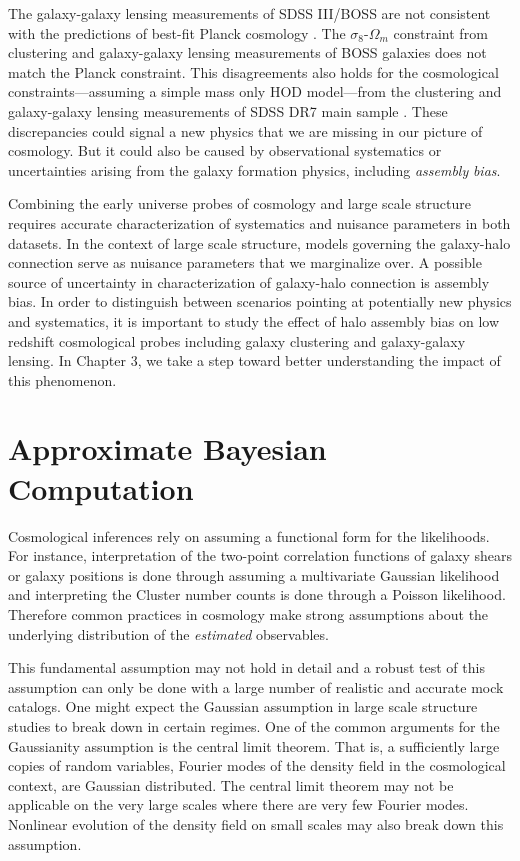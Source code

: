 The galaxy-galaxy lensing measurements of SDSS III/BOSS \citep{miyatake15,lensingislow} are not consistent with the predictions of best-fit Planck cosmology \citep{planckII}.
The $\sigma_{8}$-$\Omega_{m}$ constraint from clustering and galaxy-galaxy lensing measurements of BOSS galaxies \citep{more15} does not match the Planck constraint.
This disagreements also holds for the cosmological constraints---assuming a simple mass only HOD model---from the clustering and galaxy-galaxy lensing measurements of SDSS DR7 main sample \citep{cacciato13}. These discrepancies could signal a new physics that we are missing in our picture of cosmology. But it could also be caused by observational systematics or uncertainties arising from the galaxy formation physics, including \emph{assembly} \emph{bias}.

Combining the early universe probes of cosmology and large scale structure requires accurate 
characterization of systematics and nuisance parameters in both datasets. In the context of large scale 
structure, models governing the galaxy-halo connection serve as nuisance parameters that we marginalize over. A possible source of uncertainty in characterization of galaxy-halo connection is assembly bias. In order to distinguish between scenarios pointing at potentially new physics and systematics, it is important to study the effect of halo assembly bias on low redshift cosmological probes including galaxy clustering and galaxy-galaxy lensing. In Chapter 3, we take a step toward better understanding the impact of this phenomenon. 

\section{Approximate Bayesian Computation}

Cosmological inferences rely on assuming a functional form for the likelihoods. For instance, interpretation of the 
two-point correlation functions of galaxy shears or galaxy positions is done through assuming a multivariate Gaussian likelihood 
and interpreting the Cluster number counts is done through a Poisson likelihood. Therefore common practices in 
cosmology make strong assumptions about the underlying distribution of the \emph{estimated} observables.

This fundamental assumption may not hold in detail and a robust test of this assumption can only be done with a large 
number of realistic and accurate mock catalogs. One might expect the Gaussian assumption in large scale structure studies 
to break down in certain regimes. One of the common arguments for the Gaussianity assumption is the central limit theorem. That is, a sufficiently large copies 
of random variables, Fourier modes of the density field in the cosmological context, are Gaussian distributed. The central limit theorem may not be applicable on 
the very large scales where there are very few Fourier modes. Nonlinear evolution of the density field on small scales may also break down this assumption. 

